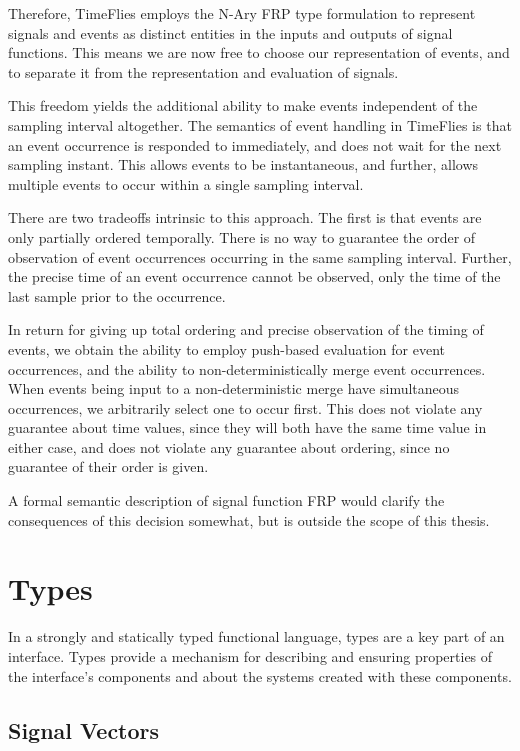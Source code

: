 Therefore, TimeFlies employs the N-Ary FRP type formulation to represent signals and
events as distinct entities in the inputs and outputs of signal functions. This means
we are now free to choose our representation of events, and to separate it from the
representation and evaluation of signals.

This freedom yields the additional ability to make events independent of the sampling
interval altogether. The semantics of event handling in TimeFlies is that an event occurrence
is responded to immediately, and does not wait for the next sampling instant. This allows events
to be instantaneous, and further, allows multiple events to occur within a single sampling interval.

There are two tradeoffs intrinsic to this approach. The first is that events are only partially ordered
temporally. There is no way to guarantee the order of observation of event occurrences occurring in the
same sampling interval. Further, the precise time of an event occurrence cannot be observed, only the 
time of the last sample prior to the occurrence.

In return for giving up total ordering and precise observation of the timing of events, we obtain the
ability to employ push-based evaluation for event occurrences, and the ability to non-deterministically
merge event occurrences. When events being input to a non-deterministic merge have simultaneous occurrences,
we arbitrarily select one to occur first. This does not violate any guarantee about time values, since
they will both have the same time value in either case, and does not violate any guarantee about ordering,
since no guarantee of their order is given.

A formal semantic description of signal function FRP would clarify the consequences of this decision somewhat,
but is outside the scope of this thesis.

\section{Types}
\label{section:System_Design_and_Interface-Types}

In a strongly and statically typed functional language, types are a key part of
an interface. Types provide a mechanism for describing and ensuring properties
of the interface's components and about the systems created with these
components. 

\subsection{Signal Vectors}
\label{subsection:System_Design_and_Interface-Types-Signal_Vectors}

